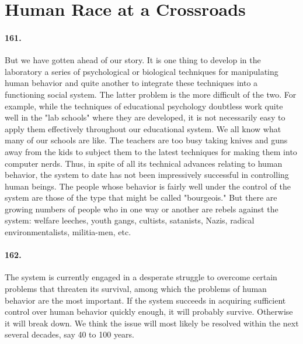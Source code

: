 \documentclass[12pt]{book}
\newcommand{\mysection}[1]{\section*{#1} \addcontentsline{toc}{section}{#1}}
\begin{document}
\mysection{Human Race at a Crossroads}


\paragraph{161.} But we have gotten ahead of our story. It is one thing to develop in the laboratory a series of psychological or biological techniques for manipulating human behavior and quite another to integrate these techniques into a functioning social system. The latter problem is the more difficult of the two. For example, while the techniques of educational psychology doubtless work quite well in the "lab schools" where they are developed, it is not necessarily easy to apply them effectively throughout our educational system. We all know what many of our schools are like.  The teachers are too busy taking knives and guns away from the kids to subject them to the latest techniques for making them into computer nerds.  Thus, in spite of all its technical advances relating to human behavior, the system to date has not been impressively successful in controlling human beings. The people whose behavior is fairly well under the control of the system are those of the type that might be called "bourgeois." But there are growing numbers of people who in one way or another are rebels against the system: welfare leeches, youth gangs, cultists, satanists, Nazis, radical environmentalists, militia-men, etc.


\paragraph{162.} The system is currently engaged in a desperate struggle to overcome certain problems that threaten its survival, among which the problems of human behavior are the most important. If the system succeeds in acquiring sufficient control over human behavior quickly enough, it will probably survive. Otherwise it will break down. We think the issue will most likely be resolved within the next several decades, say 40 to 100 years.
\end{document}
